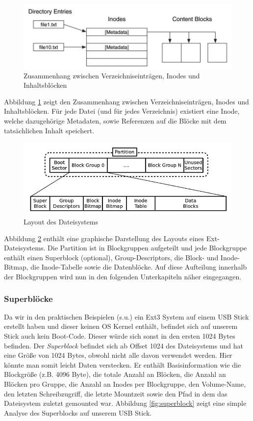 \begin{figure}[H]
	\centering
	\includegraphics[width=12cm,keepaspectratio=true]{pictures/ext1.png}
	\caption{
		Zusammenhang zwischen Verzeichniseinträgen, Inodes und Inhaltsblöcken \cite{Carrier.06.01.2022}
	}
	\label{fig:ext1}
\end{figure}

Abbildung \ref{fig:ext1} zeigt den Zusammenhang zwischen Verzeichniseinträgen, Inodes und Inhaltsblöcken. Für jede Datei (und für jedes Verzeichnis) existiert eine Inode, welche dazugehörige Metadaten, sowie Referenzen auf die Blöcke mit dem tatsächlichen Inhalt speichert.

\begin{figure}[H]
	\centering
	\includegraphics[width=12cm,keepaspectratio=true]{pictures/layout.png}
	\caption{
		Layout des Dateisystems \cite{AnalysisExt4.07.01.2022}
	}
	\label{fig:layout}
\end{figure}

Abbildung \ref{fig:layout} enthält eine graphische Darstellung des Layouts eines Ext-Dateisystems. Die Partition ist in Blockgruppen aufgeteilt und jede Blockgruppe enthält einen Superblock (optional), Group-Descriptors, die Block- und Inode-Bitmap, die Inode-Tabelle sowie die Datenblöcke. Auf diese Aufteilung innerhalb der Blockgruppen wird nun in den folgenden Unterkapiteln näher eingegangen.

\subsubsection{Superblöcke}

Da wir in den praktischen Beispielen (s.u.) ein Ext3 System auf einem USB Stick erstellt haben und dieser keinen OS Kernel enthält, befindet sich auf unserem Stick auch kein Boot-Code. Dieser würde sich sonst in den ersten 1024 Bytes befinden. Der \textit{Superblock} befindet sich ab Offset 1024 des Dateisystems und hat eine Größe von 1024 Bytes, obwohl nicht alle davon verwendet werden. Hier könnte man somit leicht Daten verstecken. Er enthält Basisinformation wie die Blockgröße (z.B. 4096 Byte), die totale Anzahl an Blöcken, die Anzahl an Blöcken pro Gruppe, die Anzahl an Inodes per Blockgruppe, den Volume-Name, den letzten Schreibzugriff, die letzte Mountzeit sowie den Pfad in dem das Dateisystem zuletzt gemounted war. Abbildung \ref{fig:superblock} zeigt eine simple Analyse des Superblocks auf unserem USB Stick.

